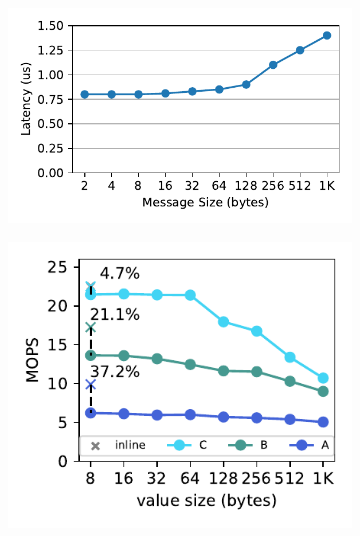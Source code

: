 \begin{figure}[t]
    \centering
    \newcommand{\subfigwidth}{0.32\linewidth}
    \begin{subfigure}{\subfigwidth}
        \includegraphics[width=0.99\linewidth]{fig/rdma_latency.pdf}
    \end{subfigure}
    \begin{subfigure}{\subfigwidth}
      \includegraphics[width=0.99\linewidth]{fig/extent.pdf}
    \end{subfigure}
    \begin{subfigure}{\subfigwidth}

\end{subfigure}
\end{figure}
